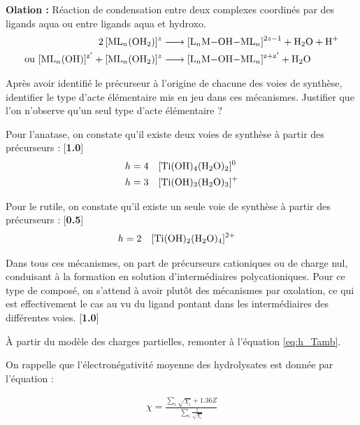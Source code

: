 \documentclass[twoside,a4paper,11pt,addpoints]{exam}%
\begin{document}
\begin{questions}
\begin{mybox}
\begin{solution}[5cm]
\textbf{Olation :} Réaction de condensation entre deux complexes coordinés par des ligands aqua  ou entre ligands aqua et hydroxo.
\begin{align*}
\ce{2 [ML_n(OH2)]^z &-> [L_nM-OH-ML_n]^{2z-1} + H2O + H^+} \\
\text{ou }\ce{[ML_n(OH)]^{z'} + [ML_n(OH2)]^z &-> [L_nM-OH-ML_n]^{z+z'} + H2O}
\end{align*}

\end{solution}
\end{mybox}

\question[2\half] Après avoir identifié le précurseur à l'origine de chacune des voies de synthèse, identifier le type d'acte élémentaire mis en jeu dans ces mécanismes. Justifier que l'on n'observe qu'un seul type d'acte élémentaire ?

\begin{mybox}
\begin{solution}[5cm]

Pour l'anatase, on constate qu'il existe deux voies de synthèse à partir des précurseurs : [\textbf{1.0}]
\begin{align*}
h=4 & \quad \ce{[Ti(OH)4(H2O)2]^0} \\
h=3 & \quad \ce{[Ti(OH)3(H2O)3]^{+}}
\end{align*}

Pour le rutile, on constate qu'il existe un seule voie de synthèse à partir des précurseurs : [\textbf{0.5}]
\begin{align*}
h=2 & \quad \ce{[Ti(OH)2(H2O)4]^{2+}}
\end{align*}

Dans tous ces mécanismes, on part de précurseurs cationiques ou de charge nul, conduisant à la formation en solution d'intermédiaires polycationiques. Pour ce type de composé, on s'attend à avoir plutôt des mécanismes par oxolation, ce qui est effectivement le cas au vu du ligand pontant dans les intermédiaires des différentes voies. [\textbf{1.0}]


\end{solution}
\end{mybox}


\bonusquestion[4] \`{A} partir du modèle des charges partielles, remonter à l'équation \ref{eq:h_Tamb}. 

On rappelle que l'électronégativité moyenne des hydrolysates est donnée par l'équation :

\begin{align*}
\chi = \frac{\sum_i \sqrt{\chi_i^\circ} + 1.36 Z}{\sum_i \frac{1}{\sqrt{\chi_i^\circ}}}
\end{align*}


\end{questions}
\end{document}
